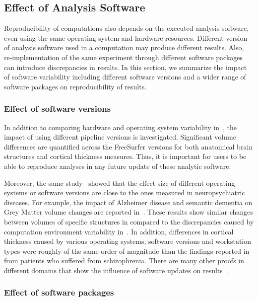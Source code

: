 \subsection{Effect of Analysis Software}

Reproducibility of computations also depends on the executed analysis 
software, even using the same operating system and hardware resources. 
Different version of analysis software used in a computation may 
produce different results. Also, re-implementation of the same 
experiment through different software packages can introduce 
discrepancies in results. In this section, we summarize the impact of 
software variability including different software versions and a wider 
range of software packages on reproducibility of results. 

\subsubsection{Effect of software versions} 

In addition to comparing hardware and operating system variability 
in~\cite{Gronenschild2012}, the impact of using different pipeline 
versions is investigated.
Significant volume differences are quantified across the FreeSurfer 
versions for both anatomical brain structures and cortical thickness 
measures. Thus, it is important for users to be able to reproduce 
analyses in any future update of these analytic software. 

Moreover, the same study~\cite{Gronenschild2012} showed that the effect 
size of different operating systems or software versions are close to 
the ones measured in neuropsychiatric diseases. For example, the impact 
of Alzheimer disease and semantic dementia on Grey Matter volume 
changes are reported in~\cite{lehmann2010atrophy}. These results show 
similar changes between volumes of specific structures in compared to 
the discrepancies caused by computation environment variability 
in~\cite{Gronenschild2012}. In addition, differences in cortical 
thickness caused by various operating systems, software versions and 
workstation types were roughly of the same order of magnitude than the 
findings reported in~\cite{kuperberg2003regionally} from patients who 
suffered from schizophrenia. There are many other proofs in different 
domains that show the influence of software updates on  
results~\cite{shim2015effect, wadi2016impact}.

\subsubsection{Effect of software packages} 
\label{swf_effect}

